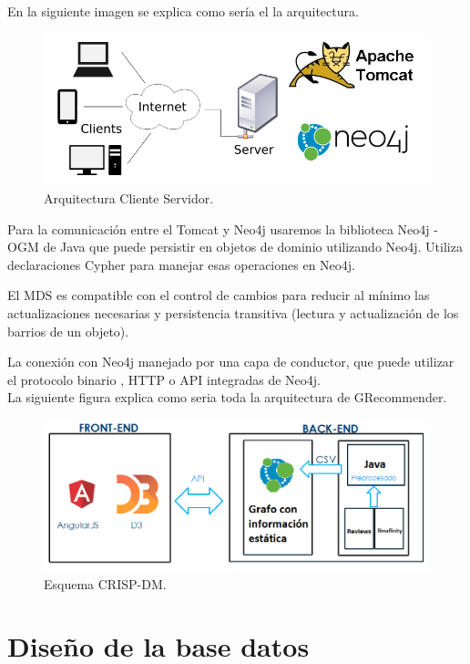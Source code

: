 \documentclass[12pt,a4paper]{article}
\begin{document}
		En la siguiente imagen se explica como sería el la arquitectura.
		
		\begin{figure}[tbph!]
			\centering
			\includegraphics[width=1\linewidth]{images/Arq_clientserver.png}
			\caption{Arquitectura Cliente Servidor.}
			\label{fig:Arq-client-serv}
		\end{figure}
		\clearpage
		Para la comunicación entre el Tomcat y Neo4j usaremos la biblioteca Neo4j - OGM de Java que puede persistir en objetos de dominio utilizando Neo4j. Utiliza declaraciones Cypher para manejar esas operaciones en Neo4j.
		
		El MDS es compatible con el control de cambios para reducir al mínimo las actualizaciones necesarias y persistencia transitiva (lectura y actualización de los barrios de un objeto).
		
		La conexión con Neo4j manejado por una capa de conductor, que puede utilizar el protocolo binario , HTTP o API integradas de Neo4j.\\
		La siguiente figura explica como seria toda la arquitectura de GRecommender.\\
		
		
		\begin{figure}[tbph!]
			\centering
			\includegraphics[width=1\linewidth]{images/Arquitect_GRecommend.png}
			\caption{Esquema CRISP-DM.}
			\label{fig:EsquemaCRISPDM}
		\end{figure}
		\clearpage
		\section{Diseño de la base datos}
		
\end{document}
